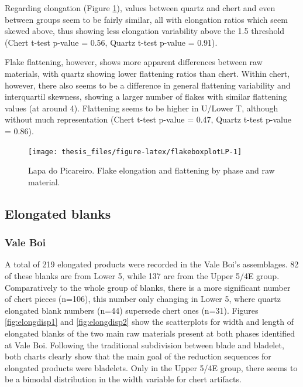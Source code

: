 \documentclass[12pt,twoside]{reedthesis}
\begin{document}
Regarding elongation (Figure \ref{fig:flakeboxplotLP}), values between quartz and chert and even between groups seem to be fairly similar, all with elongation ratios which seem skewed above, thus showing less elongation variability above the 1.5 threshold (Chert t-test p-value = 0.56, Quartz t-test p-value = 0.91).

Flake flattening, however, shows more apparent differences between raw materials, with quartz showing lower flattening ratios than chert. Within chert, however, there also seems to be a difference in general flattening variability and interquartil skewness, showing a larger number of flakes with similar flattening values (at around 4). Flattening seems to be higher in U/Lower T, although without much representation (Chert t-test p-value = 0.47, Quartz t-test p-value = 0.86).
\begin{figure}

{\centering \texttt{[image: thesis\_files/figure-latex/flakeboxplotLP-1]} 

}

\caption{Lapa do Picareiro. Flake elongation and flattening by phase and raw material.}\label{fig:flakeboxplotLP}
\end{figure}
\hypertarget{elongated-blanks}{%
\subsection{Elongated blanks}\label{elongated-blanks}}

\hypertarget{vale-boi-6}{%
\subsubsection{Vale Boi}\label{vale-boi-6}}

A total of 219 elongated products were recorded in the Vale Boi's assemblages. 82 of these blanks are from Lower 5, while 137 are from the Upper 5/4E group. Comparatively to the whole group of blanks, there is a more significant number of chert pieces (n=106), this number only changing in Lower 5, where quartz elongated blank numbers (n=44) supersede chert ones (n=31). Figures \ref{fig:elongdisp1} and \ref{fig:elongdisp2} show the scatterplots for width and length of elongated blanks of the two main raw materials present at both phases identified at Vale Boi. Following the traditional subdivision between blade and bladelet, both charts clearly show that the main goal of the reduction sequences for elongated products were bladelets. Only in the Upper 5/4E group, there seems to be a bimodal distribution in the width variable for chert artifacts.
\end{document}
